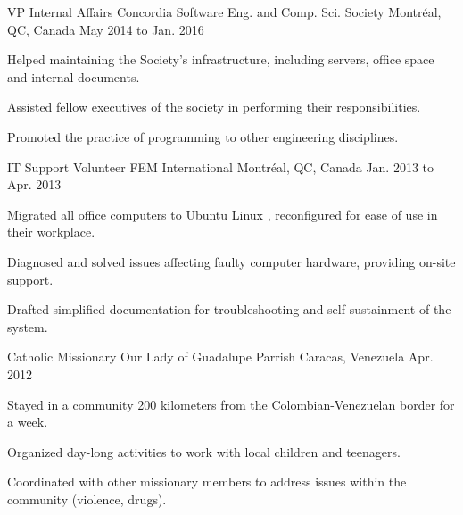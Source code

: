 \begin{cventries}
  \cventry
    {VP Internal Affairs} %
    {Concordia Software Eng. and Comp. Sci. Society} %
    {Montréal, QC, Canada} %
    {May 2014 to Jan. 2016} %
    {
      \begin{cvitems} %
        \item {Helped maintaining the Society’s infrastructure, including servers, office space and internal documents.}
        \item {Assisted fellow executives of the society in performing their responsibilities.}
        \item {Promoted the practice of programming to other engineering disciplines.}
      \end{cvitems}
    }
    \vspace{2.0mm}

  \cventry
    {IT Support Volunteer} %
    {FEM International} %
    {Montréal, QC, Canada} %
    {Jan. 2013 to Apr. 2013} %
    {
      \begin{cvitems} %
        \item {Migrated all office computers to Ubuntu Linux , reconfigured for ease of use in their workplace.}
        \item {Diagnosed and solved issues affecting faulty computer hardware, providing on-site support.}
        \item {Drafted simplified documentation for troubleshooting and self-sustainment of the system.}
      \end{cvitems}
    }
    \vspace{2.0mm}

  \cventry
    {Catholic Missionary} %
    {Our Lady of Guadalupe Parrish} %
    {Caracas, Venezuela} %
    {Apr. 2012} %
    {
      \begin{cvitems} %
        \item {Stayed in a community 200 kilometers from the Colombian-Venezuelan border for a week.}
        \item {Organized day-long activities to work with local children and teenagers.}
        \item {Coordinated with other missionary members to address issues within the community (violence, drugs).}
      \end{cvitems}
    }
    \vspace{2.0mm}
    

\end{cventries}

